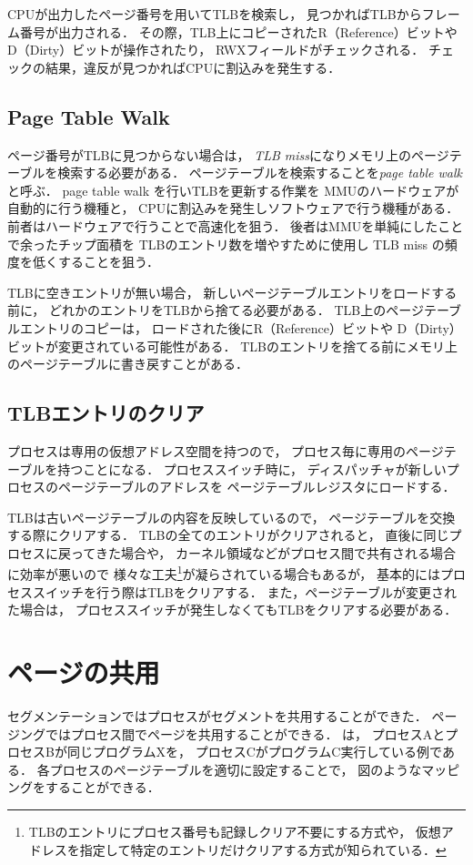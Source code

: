 CPUが出力したページ番号を用いてTLBを検索し，
見つかればTLBからフレーム番号が出力される．
その際，TLB上にコピーされたR（Reference）ビットや
D（Dirty）ビットが操作されたり，
RWXフィールドがチェックされる．
チェックの結果，違反が見つかればCPUに割込みを発生する．

\subsection{Page Table Walk}
ページ番号がTLBに見つからない場合は，
\emph{TLB miss}になりメモリ上のページテーブルを検索する必要がある．
ページテーブルを検索することを\emph{page table walk}と呼ぶ．
page table walk を行いTLBを更新する作業を
MMUのハードウェアが自動的に行う機種と，
CPUに割込みを発生しソフトウェアで行う機種がある．
前者はハードウェアで行うことで高速化を狙う．
後者はMMUを単純にしたことで余ったチップ面積を
TLBのエントリ数を増やすために使用し
TLB miss の頻度を低くすることを狙う．

TLBに空きエントリが無い場合，
新しいページテーブルエントリをロードする前に，
どれかのエントリをTLBから捨てる必要がある．
TLB上のページテーブルエントリのコピーは，
ロードされた後にR（Reference）ビットや
D（Dirty）ビットが変更されている可能性がある．
TLBのエントリを捨てる前にメモリ上のページテーブルに書き戻すことがある．

\subsection{TLBエントリのクリア}
プロセスは専用の仮想アドレス空間を持つので，
プロセス毎に専用のページテーブルを持つことになる．
プロセススイッチ時に，
ディスパッチャが新しいプロセスのページテーブルのアドレスを
ページテーブルレジスタにロードする．

TLBは古いページテーブルの内容を反映しているので，
ページテーブルを交換する際にクリアする．
TLBの全てのエントリがクリアされると，
直後に同じプロセスに戻ってきた場合や，
カーネル領域などがプロセス間で共有される場合に効率が悪いので
様々な工夫\footnote{
  TLBのエントリにプロセス番号も記録しクリア不要にする方式や，
  仮想アドレスを指定して特定のエントリだけクリアする方式が知られている．
}が凝らされている場合もあるが，
基本的にはプロセススイッチを行う際はTLBをクリアする．
また，ページテーブルが変更された場合は，
プロセススイッチが発生しなくてもTLBをクリアする必要がある．

\section{ページの共用}
セグメンテーションではプロセスがセグメントを共用することができた．
ページングではプロセス間でページを共用することができる．
は，
プロセスAとプロセスBが同じプログラムXを，
プロセスCがプログラムC実行している例である．
各プロセスのページテーブルを適切に設定することで，
図のようなマッピングをすることができる．

